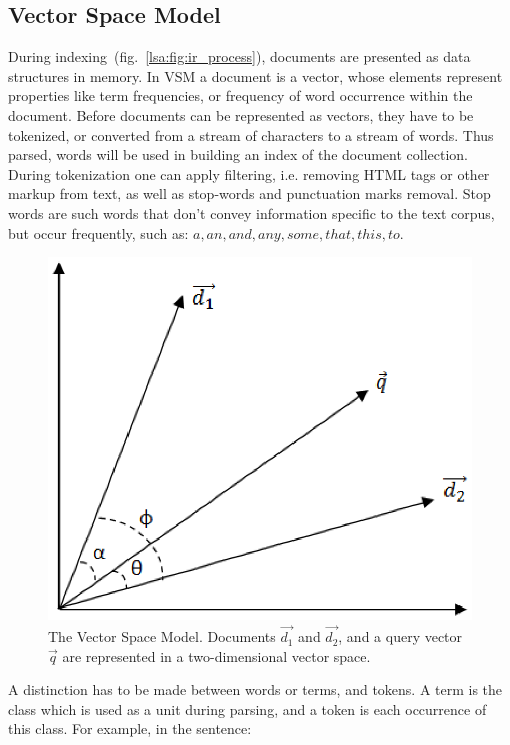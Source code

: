 \subsection{Vector Space Model}
\label{section_vsm}
During indexing~(fig.~\ref{lsa:fig:ir_process}), documents are presented as data structures in memory. In \gls{VSM} a document is a vector, whose elements represent  properties like term frequencies, or frequency of word occurrence within the document. Before documents can be represented as vectors, they have to be tokenized, or converted from a stream of characters to a stream of words. Thus parsed, words will be used in building an index of the document collection. During tokenization one can apply filtering, i.e. removing HTML tags or other markup from text, as well as stop-words and punctuation marks removal. Stop words are such words that don't convey information specific to the text corpus, but occur frequently, such as: $ a, an, and, any, some, that, this, to $. \\
%
%
\begin{figure}[H]
	\centering
	\includegraphics[scale=0.7]{img/vsm} 
	\caption[The Vector Space Model]%
           {The Vector Space Model. Documents $\vec{d_{1}}$ and $\vec{d_{2}}$, and a query vector $\vec{q}$ are represented in a two-dimensional vector space.}
\label{fig_vsm}
\end{figure}

A distinction has to be made between words or terms, and tokens. A term is the class which is used as a unit during parsing, and a token is each occurrence of this class. For example, in the sentence: 

